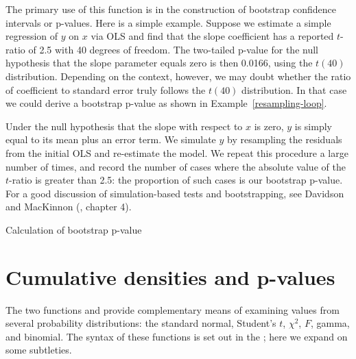 The primary use of this function is in the construction of bootstrap
confidence intervals or p-values.  Here is a simple example.  Suppose
we estimate a simple regression of $y$ on $x$ via OLS and find that
the slope coefficient has a reported $t$-ratio of 2.5 with 40 degrees
of freedom.  The two-tailed p-value for the null hypothesis that the
slope parameter equals zero is then 0.0166, using the $t(40)$
distribution.  Depending on the context, however, we may doubt whether
the ratio of coefficient to standard error truly follows the $t(40)$
distribution.  In that case we could derive a bootstrap p-value as
shown in Example~\ref{resampling-loop}.  

Under the null hypothesis that the slope with respect to $x$ is zero,
$y$ is simply equal to its mean plus an error term.  We simulate $y$
by resampling the residuals from the initial OLS and re-estimate the
model.  We repeat this procedure a large number of times, and record
the number of cases where the absolute value of the $t$-ratio is
greater than 2.5: the proportion of such cases is our bootstrap
p-value.  For a good discussion of simulation-based tests and
bootstrapping, see Davidson and MacKinnon
(\citeyear{davidson-mackinnon04}, chapter 4).

\begin{script}[htbp]
  \caption{Calculation of bootstrap p-value}
  \label{resampling-loop}
\end{script}

\section{Cumulative densities and p-values}
\label{sec:genr-cdf}

The two functions  and  provide complementary
means of examining values from several probability distributions: the
standard normal, Student's $t$, $\chi^2$, $F$, gamma, and binomial.
The syntax of these functions is set out in the \GCR; here we expand
on some subtleties.

